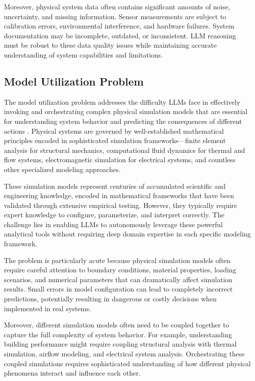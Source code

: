 Moreover, physical system data often contains significant amounts of noise, uncertainty, and missing information. Sensor measurements are subject to calibration errors, environmental interference, and hardware failures. System documentation may be incomplete, outdated, or inconsistent. LLM reasoning must be robust to these data quality issues while maintaining accurate understanding of system capabilities and limitations.

\subsection{Model Utilization Problem}

The model utilization problem addresses the difficulty LLMs face in effectively invoking and orchestrating complex physical simulation models that are essential for understanding system behavior and predicting the consequences of different actions \cite{negri2017review, tao2019digital}. Physical systems are governed by well-established mathematical principles encoded in sophisticated simulation frameworks—finite element analysis for structural mechanics, computational fluid dynamics for thermal and flow systems, electromagnetic simulation for electrical systems, and countless other specialized modeling approaches.

These simulation models represent centuries of accumulated scientific and engineering knowledge, encoded in mathematical frameworks that have been validated through extensive empirical testing. However, they typically require expert knowledge to configure, parameterize, and interpret correctly. The challenge lies in enabling LLMs to autonomously leverage these powerful analytical tools without requiring deep domain expertise in each specific modeling framework.

The problem is particularly acute because physical simulation models often require careful attention to boundary conditions, material properties, loading scenarios, and numerical parameters that can dramatically affect simulation results. Small errors in model configuration can lead to completely incorrect predictions, potentially resulting in dangerous or costly decisions when implemented in real systems.

Moreover, different simulation models often need to be coupled together to capture the full complexity of system behavior. For example, understanding building performance might require coupling structural analysis with thermal simulation, airflow modeling, and electrical system analysis. Orchestrating these coupled simulations requires sophisticated understanding of how different physical phenomena interact and influence each other.


